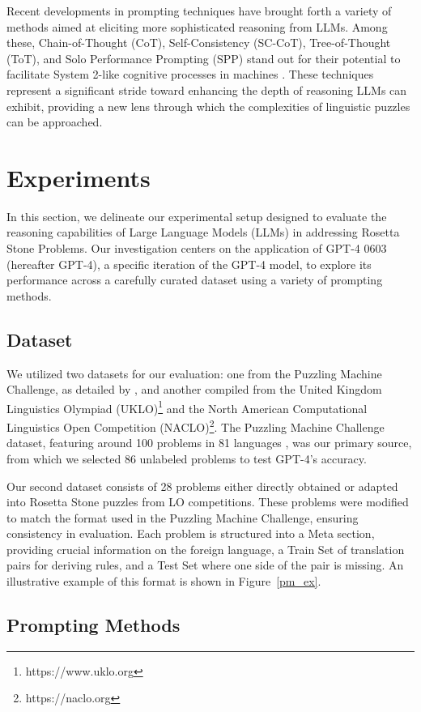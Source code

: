 \documentclass[10pt, a4paper]{article}
\begin{document}
Recent developments in prompting techniques have brought forth a variety of methods aimed at eliciting more sophisticated reasoning from LLMs. Among these, Chain-of-Thought (CoT), Self-Consistency (SC-CoT), Tree-of-Thought (ToT), and Solo Performance Prompting (SPP) stand out for their potential to facilitate System 2-like cognitive processes in machines \citep{CoT, SC, ToT, SPP}. These techniques represent a significant stride toward enhancing the depth of reasoning LLMs can exhibit, providing a new lens through which the complexities of linguistic puzzles can be approached.

\section{Experiments}
In this section, we delineate our experimental setup designed to evaluate the reasoning capabilities of Large Language Models (LLMs) in addressing Rosetta Stone Problems. Our investigation centers on the application of GPT-4 0603 (hereafter GPT-4), a specific iteration of the GPT-4 model, to explore its performance across a carefully curated dataset using a variety of prompting methods. 

\subsection{Dataset}
We utilized two datasets for our evaluation: one from the Puzzling Machine Challenge, as detailed by \citet{Puzz_Machine}, and another compiled from the United Kingdom Linguistics Olympiad (UKLO)\footnote{https://www.uklo.org} and the North American Computational Linguistics Open Competition (NACLO)\footnote{https://naclo.org}. The Puzzling Machine Challenge dataset, featuring around 100 problems in 81 languages \citep{Puzz_Machine}, was our primary source, from which we selected 86 unlabeled problems to test GPT-4's accuracy. 

Our second dataset consists of 28 problems either directly obtained or adapted into Rosetta Stone puzzles from LO competitions. These problems were modified to match the format used in the Puzzling Machine Challenge, ensuring consistency in evaluation. Each problem is structured into a Meta section, providing crucial information on the foreign language, a Train Set of translation pairs for deriving rules, and a Test Set where one side of the pair is missing. An illustrative example of this format is shown in Figure~\ref{pm_ex}. 

\subsection{Prompting Methods}
\end{document}
